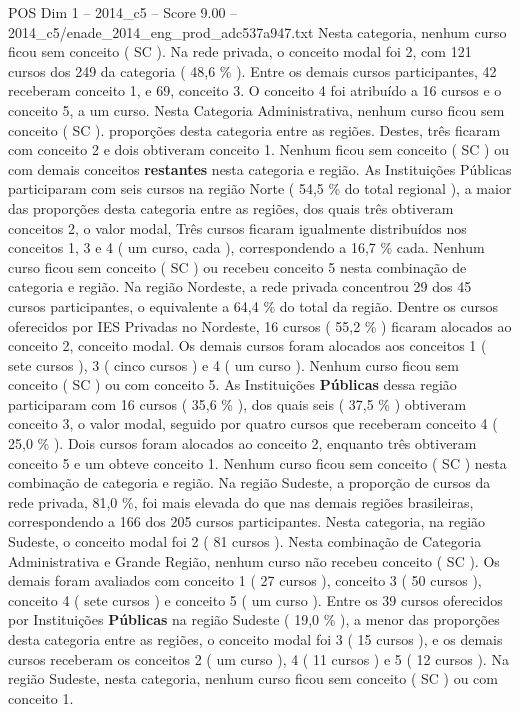 \begin{textsample}{POS Dim 1 – 2014\_c5 – Score 9.00 – 2014\_c5/enade\_2014\_eng\_prod\_adc537a947.txt}
Nesta categoria, nenhum curso ficou sem conceito ( SC ).
Na rede privada, o conceito modal foi 2, com 121 cursos dos 249 da categoria ( 48,6 \% ).
Entre os demais cursos participantes, 42 receberam conceito 1, e 69, conceito 3.
O conceito 4 foi atribuído a 16 cursos e o conceito 5, a um curso.
Nesta Categoria Administrativa, nenhum curso ficou sem conceito ( SC ). proporções desta categoria entre as regiões.
Destes, três ficaram com conceito 2 e dois obtiveram conceito 1.
Nenhum ficou sem conceito ( SC ) ou com demais conceitos \textbf{restantes} nesta categoria e região.
As Instituições Públicas participaram com seis cursos na região Norte ( 54,5 \% do total regional ), a maior das proporções desta categoria entre as regiões, dos quais três obtiveram conceitos 2, o valor modal, Três cursos ficaram igualmente distribuídos nos conceitos 1, 3 e 4 ( um curso, cada ), correspondendo a 16,7 \% cada.
Nenhum curso ficou sem conceito ( SC ) ou recebeu conceito 5 nesta combinação de categoria e região.
Na região Nordeste, a rede privada concentrou 29 dos 45 cursos participantes, o equivalente a 64,4 \% do total da região.
Dentre os cursos oferecidos por IES Privadas no Nordeste, 16 cursos ( 55,2 \% ) ficaram alocados ao conceito 2, conceito modal.
Os demais cursos foram alocados aos conceitos 1 ( sete cursos ), 3 ( cinco cursos ) e 4 ( um curso ).
Nenhum curso ficou sem conceito ( SC ) ou com conceito 5.
As Instituições \textbf{Públicas} dessa região participaram com 16 cursos ( 35,6 \% ), dos quais seis ( 37,5 \% ) obtiveram conceito 3, o valor modal, seguido por quatro cursos que receberam conceito 4 ( 25,0 \% ).
Dois cursos foram alocados ao conceito 2, enquanto três obtiveram conceito 5 e um obteve conceito 1.
Nenhum curso ficou sem conceito ( SC ) nesta combinação de categoria e região.
Na região Sudeste, a proporção de cursos da rede privada, 81,0 \%, foi mais elevada do que nas demais regiões brasileiras, correspondendo a 166 dos 205 cursos participantes.
Nesta categoria, na região Sudeste, o conceito modal foi 2 ( 81 cursos ).
Nesta combinação de Categoria Administrativa e Grande Região, nenhum curso não recebeu conceito ( SC ).
Os demais foram avaliados com conceito 1 ( 27 cursos ), conceito 3 ( 50 cursos ), conceito 4 ( sete cursos ) e conceito 5 ( um curso ).
Entre os 39 cursos oferecidos por Instituições \textbf{Públicas} na região Sudeste ( 19,0 \% ), a menor das proporções desta categoria entre as regiões, o conceito modal foi 3 ( 15 cursos ), e os demais cursos receberam os conceitos 2 ( um curso ), 4 ( 11 cursos ) e 5 ( 12 cursos ).
Na região Sudeste, nesta categoria, nenhum curso ficou sem conceito ( SC ) ou com conceito 1.

\end{textsample}
